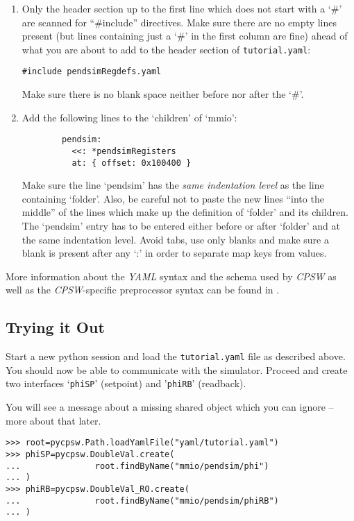 \documentclass[10pt]{article}
\newcommand{\ita}[1]{\emph{#1}}
\newcommand{\cpsw}      {\ita {CPSW}}
\newcommand{\yaml}      {\ita {YAML}}
\newcommand{\py}        {python}
\newcommand{\cod}[1] {{\tt#1}}
\newcommand{\tutyaml} {\cod{tutorial.yaml}}
\begin{document}
\begin{enumerate}
\item Only the header section up to the first line which does not start with a `\#'
      are scanned for ``\#include'' directives. Make sure there are no empty lines
      present (but lines containing just a `\#' in the first column are fine) ahead
      of what you are about to add to the header section of \tutyaml{}:
\begin{verbatim}
#include pendsimRegdefs.yaml
\end{verbatim}
      Make sure there is no blank space neither before nor after the `\#'.

\item Add the following lines to the `children' of `mmio':
\begin{verbatim}
        pendsim:
          <<: *pendsimRegisters
          at: { offset: 0x100400 }
\end{verbatim}
      Make sure the line `pendsim' has the {\em same indentation level} as the
      line containing `folder'. Also, be careful not to paste the new lines ``into
      the middle'' of the lines which make up the definition of `folder' and its
      children. The `pendsim' entry has to be entered either before or after `folder'
      and at the same indentation level. Avoid tabs, use only blanks and make sure
      a blank is present after any `:' in order to separate map keys from values.
\end{enumerate}

More information about the \yaml{} syntax and the schema used by \cpsw{} as
well as the \cpsw{}-specific preprocessor syntax can be found in \cite{yaml,yamlDefinition}.

\subsection{Trying it Out}
Start a new \py{} session and load the \tutyaml{} file as described above.
You should now be able to communicate with the simulator. Proceed and
create two interfaces `\cod{phiSP}' (setpoint) and '\cod{phiRB}' (readback).

You will see a message about a missing shared object which you can ignore --
more about that later.

\begin{verbatim}
>>> root=pycpsw.Path.loadYamlFile("yaml/tutorial.yaml")
>>> phiSP=pycpsw.DoubleVal.create(
...               root.findByName("mmio/pendsim/phi")
... )
>>> phiRB=pycpsw.DoubleVal_RO.create(
...               root.findByName("mmio/pendsim/phiRB")
... )
\end{verbatim}
\end{document}
